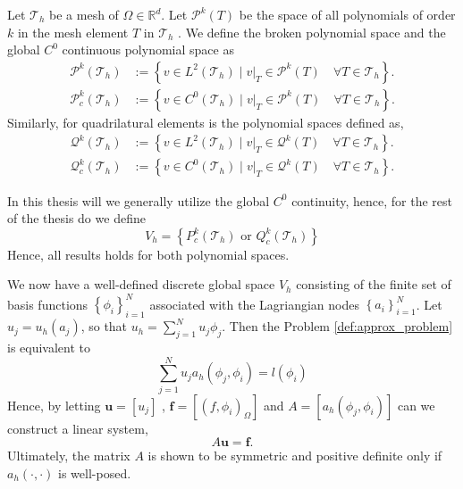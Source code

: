 \begin{definition}
    Let $\mathcal{T}_{h} $ be a mesh of $\Omega \in \mathbb{R} ^{d} $. Let $\mathcal{P}^{k}(T) $ be the space of all polynomials of order $k$ in the mesh element $T$ in $\mathcal{T}_{h}$ . We define the broken polynomial space and the global $C^{0}$ continuous polynomial space as
    \begin{equation}
        \begin{split}
    \mathcal{P}^{k} ( \mathcal{T}_{h} ) & := \left\{ v \in L^{2}( \mathcal{T}_{h} )    \mid  v|_{T} \in \mathcal{P}^k( T) \quad  \forall T \in  \mathcal{T}_{h}   \right\}. \\
    \mathcal{P}^{k}_{c} ( \mathcal{T}_{h} ) & := \left\{ v \in C^{0}( \mathcal{T}_{h}  )   \mid  v|_{T} \in \mathcal{P}^k( T) \quad  \forall T \in  \mathcal{T}_{h}   \right\}.
        \end{split}
    \end{equation}
    Similarly, for quadrilatural elements is the polynomial spaces defined as,
    \begin{equation}
        \begin{split}
    \mathcal{Q}^{k} ( \mathcal{T}_{h} ) & := \left\{ v \in L^{2}( \mathcal{T}_{h} )    \mid  v|_{T} \in \mathcal{Q}^k( T) \quad  \forall T \in  \mathcal{T}_{h}   \right\}. \\
    \mathcal{Q}^{k}_{c} ( \mathcal{T}_{h} ) & := \left\{ v \in C^{0}( \mathcal{T}_{h} )   \mid  v|_{T} \in \mathcal{Q}^k( T) \quad  \forall T \in  \mathcal{T}_{h}   \right\}.
        \end{split}
    \end{equation}

\end{definition}

In this thesis will we generally utilize the global $C^{0}$ continuity, hence, for the rest of the thesis do we define
\begin{equation}
    \label{def:Vh_background}
V_{h} =  \left\{ P_{c}^{k}( \mathcal{T}_{h} ) \text{ or }  Q_{c}^{k}( \mathcal{T}_{h} )
 \right\} \end{equation}
Hence, all results holds for both polynomial spaces.

We now have a well-defined discrete global space  $V_{h} $ consisting of the finite set of basis functions $\left\{ \phi _{i} \right\}_{i=1}^{N} $ associated with the Lagriangian nodes $\left\{ a_{i} \right\}_{i=1}^{N}  $. Let $u_{j} = u_{h}\left(
a_{j} \right) $, so that $u_{h} = \sum_{j=1}^{N} u_{j} \phi _{j}  $. Then the Problem \ref{def:approx_problem} is equivalent to
 \[
\sum_{j = 1}^{N} u_{j} a_{h}\left( \phi _{j}, \phi _{i} \right)  = l\left( \phi _{i} \right)
\]
Hence, by letting $\mathbf{u} = \left[ u_{j} \right] $ , $\mathbf{f} = \left[ \left( f, \phi _{i}  \right) _{\Omega } \right] $  and $A = \left[ a_{h}\left( \phi _{j}, \phi _{i} \right)  \right] $ can we construct a linear system, \[ A
\mathbf{u} =\mathbf{f}. \]
Ultimately, the matrix $A$ is shown to be symmetric and positive definite only if $a_{h}( \cdot ,\cdot ) $ is well-posed.

